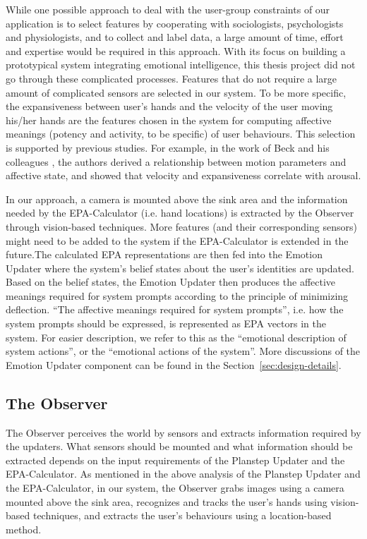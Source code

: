 While one possible approach to deal with the user-group constraints of our application is to select features by cooperating with sociologists, psychologists and physiologists, and to collect and label data, a large amount of time, effort and expertise would be required in this approach. With its focus on building a prototypical system integrating emotional intelligence, this thesis project did not go through these complicated processes. Features that do not require a large amount of complicated sensors are selected in our system. To be more specific, the expansiveness between user's hands and the velocity of the user moving his/her hands are the features chosen in the system for computing affective meanings (potency and activity, to be specific) of user behaviours. This selection is supported by previous studies. For example, in the work of Beck and his colleagues \cite{beck2010interpretation}, the authors derived a relationship between motion parameters and affective state, and showed that velocity and expansiveness correlate with arousal.

In our approach, a camera is mounted above the sink area and the information needed by the EPA-Calculator (i.e. hand locations) is extracted by the Observer through vision-based techniques. More features (and their corresponding sensors) might need to be added to the system if the EPA-Calculator is extended in the future.The calculated EPA representations are then fed into the Emotion Updater where the system's belief states about the user's identities are updated. Based on the belief states, the Emotion Updater then produces the affective meanings required for system prompts according to the principle of minimizing deflection. ``The affective meanings required for system prompts'', i.e. how the system prompts should be expressed, is represented as EPA vectors in the system. For easier description, we refer to this as the ``emotional description of system actions'', or the ``emotional actions of the system''. More discussions of the Emotion Updater component can be found in the Section~\ref{sec:design-details}.

\subsection{The Observer}

The Observer perceives the world by sensors and extracts information required by the updaters. What sensors should be mounted and what information should be extracted depends on the input requirements of the Planstep Updater and the EPA-Calculator. As mentioned in the above analysis of the Planstep Updater and the EPA-Calculator, in our system, the Observer grabs images using a camera mounted above the sink area, recognizes and tracks the user's hands using vision-based techniques, and extracts the user's behaviours using a location-based method.

